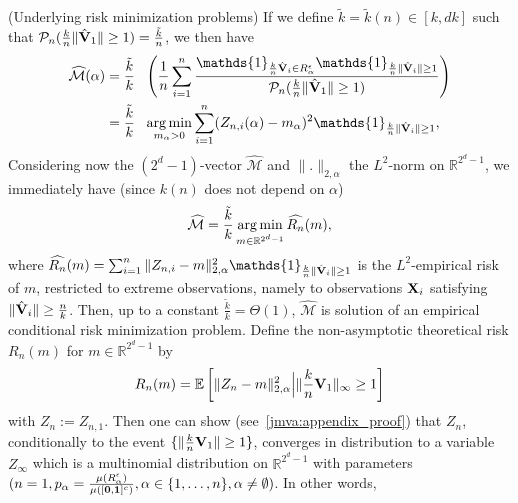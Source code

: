 \begin{remark}{(\sc Underlying risk minimization problems)}
If we define $\tilde k = \tilde k(n) \in [k, dk]$ such that $\mathcal{P}_n(\frac{k}{n} \| \hat{\mathbf V}_1 \| \ge 1) = \frac{\tilde k}{
   n}$, we then have  
\begin{align*}
\widehat{\mathcal{M}}(\alpha) &= \frac{\tilde k}{k} ~~ \left( \frac{1}{n} \sum_{i=1}^n \frac{\mathds{1}_{\frac{k}{n} \hat{\mb V}_i \in R_\alpha^\epsilon} \mathds{1}_{\frac{k}{n} \| \hat{\mb V}_i \| \ge 1}}{ \mathcal{P}_n(\frac{k}{n} \| \hat{\mb V}_1 \| \ge 1)}\right) \\
&= \frac{\tilde k}{k} ~~ \argmin_{m_\alpha > 0} \sum_{i=1}^n (Z_{n,i}(\alpha) - m_\alpha)^2 \mathds{1}_{\frac{k}{n} \| \hat{\mb V}_i \| \ge 1},
\end{align*}
Considering now the $(2^d -1)$-vector $\widehat{\mathcal{M}}$ and $\|.\|_{2, \alpha}$ the $L^2$-norm on $\mathbb{R}^{2^d-1}$, we immediately have (since $k(n)$ does not depend on $\alpha$)
\begin{align}
\label{jmva:eq:optim_pb}
\widehat{\mathcal{M}} = \frac{\tilde k}{k} \argmin_{m \in \mathbb{R}^{2^d-1}} \widehat{R_n}(m),
\end{align}
where $\widehat{R_n}(m) = \sum_{i=1}^n \|Z_{n,i} - m\|_{2,\alpha}^2 \mathds{1}_{\frac{k}{n} \| \hat{\mb V}_i \| \ge 1}$ is the $L^2$-empirical risk of $m$, restricted to extreme observations, namely to observations $\mathbf X_i$ satisfying $\| \hat{\mathbf V}_i \| \ge \frac{n}{k}$. Then, up to a constant $\frac{\tilde k}{k} = \Theta(1)$, $\widehat{\mathcal{M}}$ is solution of an empirical conditional risk minimization problem. 
\noindent
Define the non-asymptotic theoretical risk $R_n(m)$ for $m \in \mathbb{R}^{2^d-1}$ by $$R_n(m) = \mathbb{E}\left[ \|Z_n - m\|_{2,\alpha}^2  \Big| \|\frac{k}{n} \mathbf V_1\|_\infty \ge 1\right]$$
with $Z_n:=Z_{n,1}$. Then one can show (see~\ref{jmva:appendix_proof}) that $Z_n$, conditionally to the event $\{\|\frac{k}{n} \mathbf V_1\| \ge 1\}$, converges in distribution to a variable $Z_\infty$ which is a multinomial distribution on $\mathbb{R}^{2^d-1}$ with parameters $(n=1, p_\alpha = \frac{\mu(R_\alpha^\epsilon)}{\mu([\mathbf 0, \mathbf 1]^c)}, \alpha \in \{1,\ldots,n\}, \alpha \neq \emptyset)$. In other words, 

\end{remark}
